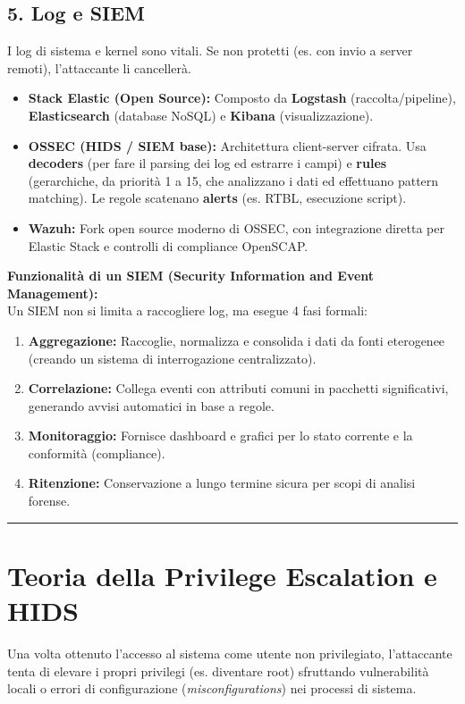 \documentclass[12pt, a4paper]{report}
\begin{document}
\subsection{5. Log e SIEM}
I log di sistema e kernel sono vitali. Se non protetti (es. con invio a server remoti), l'attaccante li cancellerà.

\begin{itemize}
	\item \textbf{Stack Elastic (Open Source):} Composto da \textbf{Logstash} (raccolta/pipeline), \textbf{Elasticsearch} (database NoSQL) e \textbf{Kibana} (visualizzazione).
	\item \textbf{OSSEC (HIDS / SIEM base):} Architettura client-server cifrata. Usa \textbf{decoders} (per fare il parsing dei log ed estrarre i campi) e \textbf{rules} (gerarchiche, da priorità 1 a 15, che analizzano i dati ed effettuano pattern matching). Le regole scatenano \textbf{alerts} (es. RTBL, esecuzione script).
	\item \textbf{Wazuh:} Fork open source moderno di OSSEC, con integrazione diretta per Elastic Stack e controlli di compliance OpenSCAP.
\end{itemize}

\textbf{Funzionalità di un SIEM (Security Information and Event Management):}\\
Un SIEM non si limita a raccogliere log, ma esegue 4 fasi formali:
\begin{enumerate}
	\item \textbf{Aggregazione:} Raccoglie, normalizza e consolida i dati da fonti eterogenee (creando un sistema di interrogazione centralizzato).
	\item \textbf{Correlazione:} Collega eventi con attributi comuni in pacchetti significativi, generando avvisi automatici in base a regole.
	\item \textbf{Monitoraggio:} Fornisce dashboard e grafici per lo stato corrente e la conformità (compliance).
	\item \textbf{Ritenzione:} Conservazione a lungo termine sicura per scopi di analisi forense.
\end{enumerate}

\noindent\rule{\textwidth}{0.4pt}

\section{Teoria della Privilege Escalation e HIDS}

Una volta ottenuto l'accesso al sistema come utente non privilegiato, l'attaccante tenta di elevare i propri privilegi (es. diventare root) sfruttando vulnerabilità locali o errori di configurazione (\textit{misconfigurations}) nei processi di sistema.
\end{document}
